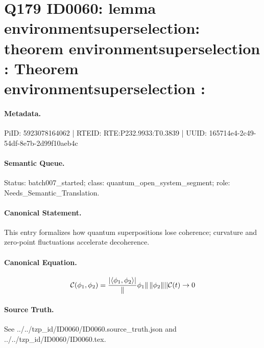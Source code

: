 \section*{Q179 ID0060: lemma environmentsuperselection: theorem environmentsuperselection : Theorem environmentsuperselection :}
\paragraph{Metadata.}
PiID: 5923078164062 | RTEID: RTE:P232.9933:T0.3839 | UUID: 165714e4-2c49-54df-8e7b-2d99f10aeb4c

\paragraph{Semantic Queue.}
Status: batch007\_started; class: quantum\_open\_system\_segment; role: Needs\_Semantic\_Translation.

\paragraph{Canonical Statement.}
This entry formalizes how quantum superpositions lose coherence; curvature and zero-point fluctuations accelerate decoherence.

\paragraph{Canonical Equation.}
\[
\mathcal{C}(\phi_{1},\phi_{2}) = \frac{\left|\langle \phi_{1},\phi_{2}\rangle\right|} \lVert\phi_{1}\rVert\,\lVert\phi_{2}\rVert || \mathcal{C}(t) \to 0
\]

\paragraph{Source Truth.}
See ../../tzp\_id/ID0060/ID0060.source\_truth.json and ../../tzp\_id/ID0060/ID0060.tex.
